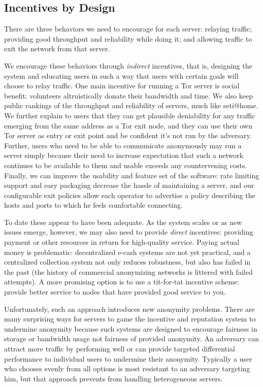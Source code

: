 \documentclass{llncs}
\begin{document}
\subsection{Incentives by Design}

There are three behaviors we need to encourage for each server: relaying
traffic; providing good throughput and reliability while doing it;
and allowing traffic to exit the network from that server.

We encourage these behaviors through \emph{indirect} incentives, that
is, designing the system and educating users in such a way that users
with certain goals will choose to relay traffic.  One
main incentive for running a Tor server is social benefit: volunteers
altruistically donate their bandwidth and time.  We also keep public
rankings of the throughput and reliability of servers, much like
seti@home.  We further explain to users that they can get plausible
deniability for any traffic emerging from the same address as a Tor
exit node, and they can use their own Tor server
as entry or exit point and be confident it's not run by the adversary.
Further, users who need to be able to communicate anonymously
may run a server simply because their need to increase
expectation that such a network continues to be available to them
and usable exceeds any countervening costs.
Finally, we can improve the usability and feature set of the software:
rate limiting support and easy packaging decrease the hassle of
maintaining a server, and our configurable exit policies allow each
operator to advertise a policy describing the hosts and ports to which
he feels comfortable connecting.

To date these appear to have been adequate. As the system scales or as
new issues emerge, however, we may also need to provide
 \emph{direct} incentives:
providing payment or other resources in return for high-quality service.
Paying actual money is problematic: decentralized e-cash systems are
not yet practical, and a centralized collection system not only reduces
robustness, but also has failed in the past (the history of commercial
anonymizing networks is littered with failed attempts).  A more promising
option is to use a tit-for-tat incentive scheme: provide better service
to nodes that have provided good service to you.

Unfortunately, such an approach introduces new anonymity problems.
There are many surprising ways for servers to game the incentive and
reputation system to undermine anonymity because such systems are
designed to encourage fairness in storage or bandwidth usage not
fairness of provided anonymity. An adversary can attract more traffic
by performing well or can provide targeted differential performance to
individual users to undermine their anonymity. Typically a user who
chooses evenly from all options is most resistant to an adversary
targeting him, but that approach prevents from handling heterogeneous
servers.
\end{document}
